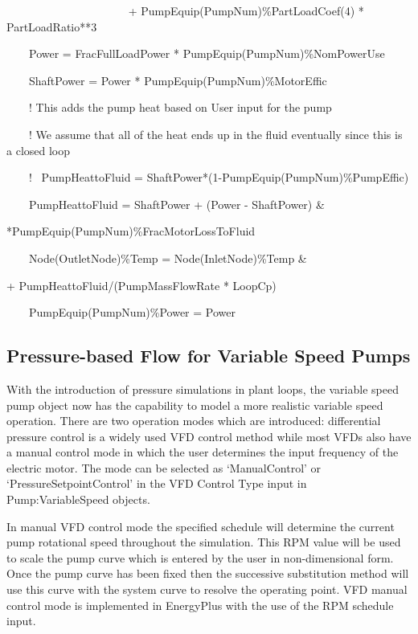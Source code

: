 ~~~~~~~~~~~~~~~~~~~~~ + PumpEquip(PumpNum)\%PartLoadCoef(4) * PartLoadRatio**3

~~~~Power = FracFullLoadPower * PumpEquip(PumpNum)\%NomPowerUse

~~~~ShaftPower = Power * PumpEquip(PumpNum)\%MotorEffic

~~~~! This adds the pump heat based on User input for the pump

~~~~! We assume that all of the heat ends up in the fluid eventually since this is a closed loop

~~~~!~ PumpHeattoFluid = ShaftPower*(1-PumpEquip(PumpNum)\%PumpEffic)

~~~~PumpHeattoFluid = ShaftPower + (Power - ShaftPower) \& \par
\hspace{5cm} *PumpEquip(PumpNum)\%FracMotorLossToFluid

~~~~Node(OutletNode)\%Temp = Node(InletNode)\%Temp \& \par
\hspace{6cm} + PumpHeattoFluid/(PumpMassFlowRate * LoopCp)

~~~~PumpEquip(PumpNum)\%Power = Power

\subsection{Pressure-based Flow for Variable Speed Pumps}\label{pressure-based-flow-for-variable-speed-pumps}

With the introduction of pressure simulations in plant loops, the variable speed pump object now has the capability to model a more realistic variable speed operation. There are two operation modes which are introduced: differential pressure control is a widely used VFD control method while most VFDs also have a manual control mode in which the user determines the input frequency of the electric motor. The mode can be selected as `ManualControl' or `PressureSetpointControl' in the VFD Control Type input in Pump:VariableSpeed objects.

In manual VFD control mode the specified schedule will determine the current pump rotational speed throughout the simulation. This RPM value will be used to scale the pump curve which is entered by the user in non-dimensional form. Once the pump curve has been fixed then the successive substitution method will use this curve with the system curve to resolve the operating point. VFD manual control mode is implemented in EnergyPlus with the use of the RPM schedule input.

